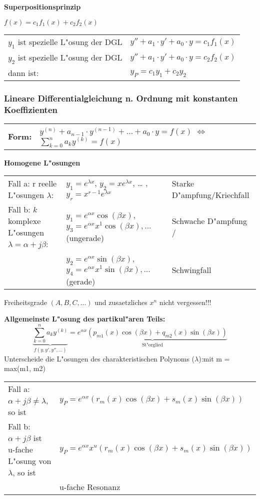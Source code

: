 	\textbf{Superpositionsprinzip}
	
	$f(x)=c_1f_1(x)+c_2f_2(x)$\\
	\begin{tabular}{p{8cm}p{4cm}}
	$y_1$ ist spezielle L"osung der DGL &
	$y''+a_1\cdot y'+a_0\cdot y=c_1f_1(x)$ \\
	$y_2$ ist spezielle L"osung der DGL &
	$y''+a_1\cdot y'+a_0\cdot y=c_2f_2(x)$ \\
	dann ist:                          &
	$y_P=c_1y_1+c_2y_2$\\
	\end{tabular}
	
	\newpage
	
	\subsubsection{Lineare Differentialgleichung n. Ordnung mit konstanten Koeffizienten}
	\begin{tabular}{p{4cm}p{12cm}}
	\textbf{Form:} &
	$y^{(n)}+a_{n-1}\cdot y^{(n-1)}+\ldots +a_0\cdot y=f(x)$ $\Leftrightarrow$ $\sum\limits_{k=0}^na_ky^{(k)}=f(x)$\\
	\end{tabular}
	
	\textbf{Homogene L"osungen}\\
	\begin{tabular}{lll}
	Fall a: r reelle L"osungen $\lambda$: 
		& $y_1=e^{\lambda x}$, $y_2=xe^{\lambda x}$, \ldots
		,$y_r=x^{r-1}e^{\lambda x}$ 
		& Starke D"ampfung/Kriechfall\\
	Fall b: $k$ komplexe L"osungen $\lambda=\alpha +j\beta$: 
		&$y_1=e^{\alpha x}\cos(\beta x)$, $y_{3}=e^{\alpha x}x^1\cos(\beta
	x),...$ (ungerade)
		& Schwache D"ampfung /\\
		&$y_{2}=e^{\alpha x}\sin(\beta x)$, $y_{4}=e^{\alpha
	x}x^{1}\sin(\beta x),...$ (gerade)
		& Schwingfall\\
	\end{tabular}
	
	Freiheitsgrade $(A,B,C, ...)$ und zusaetzliches $x^{n}$ nicht vergessen!!! 
	
	\textbf{Allgemeinste L"osung des partikul"aren Teils:}\\
	$$\underbrace{\sum_{k=0}^n a_k y^{(k)}}_{f(y,y',y'',\ldots)} = \underbrace{e^{\alpha x} (p_{m1}(x) \cos (\beta x) + q_{m2}(x) \sin (\beta x))}_{\text{St"orglied}}$$
	Unterscheide die L"osungen des charakteristischen Polynoms ($\lambda$):\hspace{5.5cm}mit m = max(m1, m2)\\
	\begin{tabular}{p{8cm}p{8.5cm}}
	Fall a: $\alpha + j\beta \neq \lambda$, so ist &
	$y_P = e^{\alpha x}(r_m(x)\cos(\beta x) + s_m(x) \sin(\beta x))$\\
	Fall b: $\alpha + j\beta$  ist u-fache L"osung von $\lambda$, so ist &
	$y_P = e^{\alpha x} x^u (r_m(x) \cos(\beta x) + s_m(x) \sin(\beta x))$\\
	&
	u-fache Resonanz
	
	\end{tabular}
	
